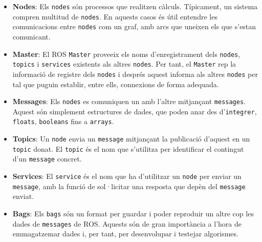 \documentclass[12pt,a4paper,final,twoside]{article}
\begin{document}
\begin{itemize}
\item \textbf{Nodes}: Els \texttt{nodes} són processos que realitzen càlculs. Típicament, un sistema compren multitud de \texttt{nodes}. En aquests casos és útil entendre les comunicacions entre \texttt{nodes} com un graf, amb arcs que uneixen els que s'estan comunicant.

\item \textbf{Master}: El ROS \texttt{Master} proveeix els noms d'enregistrament dels \texttt{nodes}, \texttt{topics} i \texttt{services} existents als altres \texttt{nodes}. Per tant, el \texttt{Master} rep la informació de registre dels \texttt{nodes} i després aquest informa als altres \texttt{nodes} per tal que puguin establir, entre ells, connexions de forma adequada. 

\item \textbf{Messages}: Els \texttt{nodes} es comuniquen un amb l'altre mitjançant \texttt{messages}. Aquest són simplement estructures de dades, que poden anar des d'\texttt{integrer}, \texttt{floats}, \texttt{booleans} fins a \texttt{arrays}.

\item \textbf{Topics}: Un \texttt{node} envia un \texttt{message} mitjançant la publicació d'aquest en un \texttt{topic} donat. El \texttt{topic} és el nom que s'utilitza per identificar el contingut d'un \texttt{message} concret. 

\item \textbf{Services}: El \texttt{service} és el nom que ha d'utilitzar un \texttt{node} per enviar un \texttt{message}, amb la funció de sol·licitar una resposta que depèn del \texttt{message} enviat.

\item \textbf{Bags}: Els \texttt{bags} són un format per guardar i poder reproduir un altre cop les dades de \texttt{messages} de ROS. Aquests són de gran importància a l'hora de emmagatzemar dades i, per tant, per desenvolupar i testejar algorismes.
\end{itemize}
\end{document}
